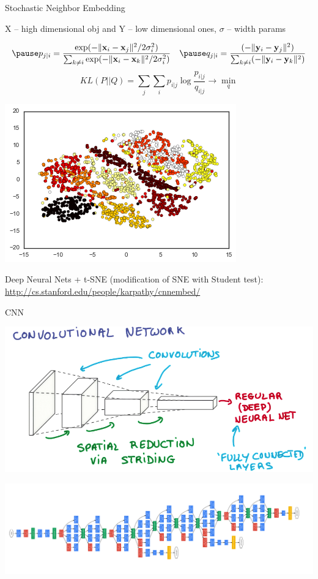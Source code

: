\documentclass{beamer}
\begin{document}
\begin{frame}{Stochastic Neighbor Embedding}
	
	\pause  X -- high dimensional obj and Y -- low dimensional ones, $\sigma$ -- width params
	
	$$\pause p_{j\mid i} = \frac{\exp(-\lVert\mathbf{x}_i - \mathbf{x}_j\rVert^2 / 2\sigma_i^2)}{\sum_{k \neq i} \exp(-\lVert\mathbf{x}_i - \mathbf{x}_k\rVert^2 / 2\sigma_i^2)}~~~\pause q_{j|i} = \frac{(-\lVert \mathbf{y}_i - \mathbf{y}_j\rVert^2)}{\sum_{k \neq i} (-\lVert \mathbf{y}_i - \mathbf{y}_k\rVert^2)}$$
	\pause 
	\vspace{-0.1cm}
	$$KL(P||Q) = \sum_j\sum_{i} p_{i|j} \log \frac{p_{i|j}}{q_{i|j}} \rightarrow \min_q$$
	
	 \begin{center}
		 	\pause \includegraphics[scale=0.4]{img/tsne_mnist}
	 \end{center}
	\pause
	Deep Neural Nets + t-SNE (modification of SNE with Student test): \href{http://cs.stanford.edu/people/karpathy/cnnembed/}{http://cs.stanford.edu/people/karpathy/cnnembed/}
\end{frame}

\begin{frame}{CNN}
	 \begin{center}
	 	\pause
	 	\includegraphics[scale=0.25]{img/cnn}
	 	
	 	\pause
	 	\includegraphics[scale=0.4]{img/gn}
	 \end{center}
\end{frame}
\end{document}

